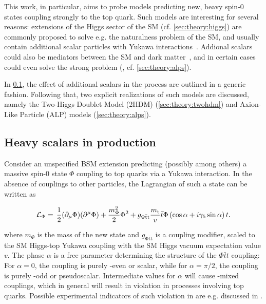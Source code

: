 This work, in particular, aims to probe models predicting new, heavy spin-0 states coupling strongly to the top quark. 
Such models are interesting for several reasons: extensions of the Higgs sector of the SM (cf. \cref{sec:theory:higgs}) are commonly proposed to solve e.g. the naturalness problem of the SM, and usually contain additional scalar particles with Yukawa interactions~\cite{Branco:2011iw,Huitu:2019,Muhlleitner:2017dkd}. 
Addional scalars could also be mediators between the SM and dark matter~\cite{DMLHC:2015,Arina:2016}, and in certain cases could even solve the strong \CP problem (\cite{Dimopoulos:2016lvn,Gherghetta:2016fhp}, cf. \cref{sec:theory:alps}).

In \cref{sec:theory:ah}, the effect of additional scalars in the \pptt process are outlined in a generic fashion.
Following that, two explicit realizations of such models are discussed, namely the Two-Higgs Doublet Model (2HDM) (\cref{sec:theory:twohdm}) and Axion-Like Particle (ALP) models (\cref{sec:theory:alps}).

\subsection{Heavy scalars in \ttbartitle production}
\label{sec:theory:ah}

Consider an unspecified BSM extension predicting (possibly among others) a massive spin-0 state $\Phi$ coupling to top quarks via a Yukawa interaction. In the absence of couplings to other particles, the Lagrangian of such a state can be written as~\cite{Maltoni:2024tul}

\begin{equation}
\label{eq:theory:lag_ah}
    \mathcal{L}_{\Phi} = \, \frac{1}{2} (\partial_\mu \Phi ) (\partial^\mu \Phi ) +\frac{m_{\Phi}^2}{2} \Phi^2 
    + g_{\mathrm{\Phi \bar{t} t}} \frac{m_{\mathrm{t}}}{v} \bar{t} \Phi \left( \cos{\alpha} + i \gamma_5 \sin{\alpha} \right) t .
\end{equation}

\noindent where $m_\Phi$ is the mass of the new state and $g_{\mathrm{\Phi \bar{t} t}}$ is a coupling modifier, scaled to the SM Higgs-top Yukawa coupling with the SM Higgs vacuum expectation value $v$. The phase $\alpha$ is a free parameter determining the \CP structure of the $\Phi \bar{t} t$ coupling: For $\alpha = 0$, the coupling is purely \CP-even or scalar, while for $\alpha = \pi/2$, the coupling is purely \CP-odd or pseudoscalar. Intermediate values for $\alpha$ will cause \CP-mixed couplings, which in general will result in  \CP violation in processes involving top quarks. Possible experimental indicators of such \CP violation in \pptt are e.g. discussed in .

